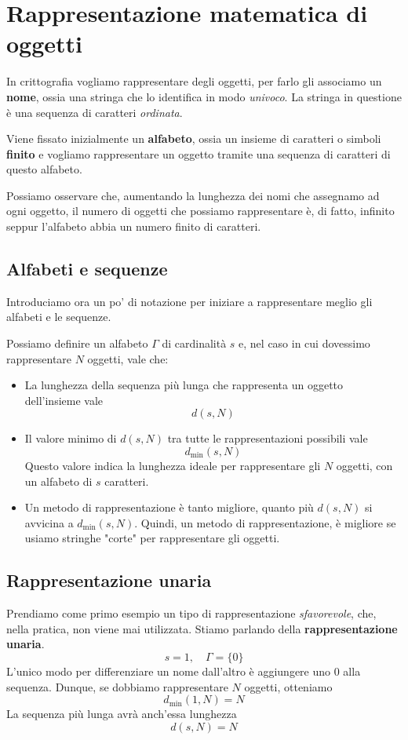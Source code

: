 \chapter{Rappresentazione matematica di oggetti}\label{rappresentazione}
In crittografia vogliamo rappresentare degli oggetti, per farlo gli associamo un \textbf{nome}, ossia una stringa che
lo identifica in modo \emph{univoco}. La stringa in questione \`e una sequenza di caratteri \emph{ordinata}.

Viene fissato inizialmente un \textbf{alfabeto}, ossia un insieme di caratteri o simboli \textbf{finito} e vogliamo
rappresentare un oggetto tramite una sequenza di caratteri di questo alfabeto.

Possiamo osservare che, aumentando la lunghezza dei nomi che assegnamo ad ogni oggetto, il numero di oggetti che
possiamo rappresentare \`e, di fatto, infinito seppur l'alfabeto abbia un numero finito di caratteri.

\section{Alfabeti e sequenze}\label{alfabeti}
Introduciamo ora un po' di notazione per iniziare a rappresentare meglio gli alfabeti e le sequenze.

Possiamo definire un alfabeto $\Gamma$ di cardinalit\`a $s$ e, nel caso in cui dovessimo rappresentare $N$ oggetti,
vale che:
\begin{itemize}
	\item La lunghezza della sequenza pi\`u lunga che rappresenta un oggetto dell'insieme vale
	      \[ d(s, N) \]
	\item Il valore minimo di $d(s, N)$ tra tutte le rappresentazioni possibili vale
	      \[ d_{\min}(s, N) \]
	      Questo valore indica la lunghezza ideale per rappresentare gli $N$ oggetti, con un alfabeto di $s$ caratteri.
	\item Un metodo di rappresentazione \`e tanto migliore, quanto pi\`u $d(s, N)$ si avvicina a $d_{\min}(s, N)$.
	      Quindi, un metodo di rappresentazione, \`e migliore se usiamo stringhe "corte" per rappresentare gli oggetti.
\end{itemize}

\section{Rappresentazione unaria}\label{rappresentazione_unaria}
Prendiamo come primo esempio un tipo di rappresentazione \emph{sfavorevole}, che, nella pratica, non viene mai
utilizzata. Stiamo parlando della \textbf{rappresentazione unaria}.
\[ s = 1, \quad \Gamma = \{ 0 \} \]
L'unico modo per differenziare un nome dall'altro \`e aggiungere uno $0$ alla sequenza. Dunque, se dobbiamo
rappresentare $N$ oggetti, otteniamo
\[ d_{\min}(1, N) = N \]
La sequenza pi\`u lunga avr\`a anch'essa lunghezza
\[ d(s, N) = N \]

